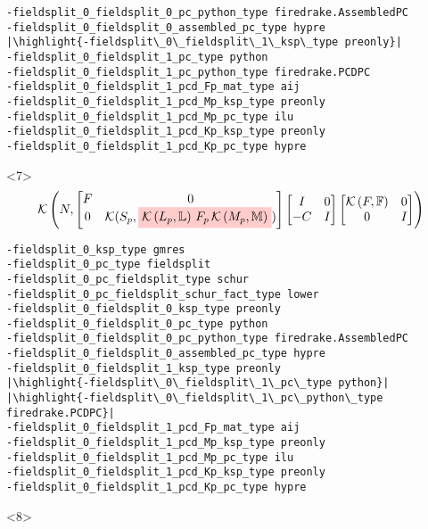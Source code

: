 \documentclass[presentation]{beamer}
\newcommand{\KSP}[2]{\ensuremath{\mathcal{K}\left(#1, \mathbb{#2}\right)}}
\newcommand{\ksp}[1]{\KSP{#1}{#1}}
\newcommand{\highlight}[1]{\colorbox{red!20}{\color{black} #1}}
\begin{document}
\begin{frame}[fragile]
\begin{onlyenv}
\begin{verbatim}
-fieldsplit_0_fieldsplit_0_pc_python_type firedrake.AssembledPC
-fieldsplit_0_fieldsplit_0_assembled_pc_type hypre
|\highlight{-fieldsplit\_0\_fieldsplit\_1\_ksp\_type preonly}|
-fieldsplit_0_fieldsplit_1_pc_type python
-fieldsplit_0_fieldsplit_1_pc_python_type firedrake.PCDPC
-fieldsplit_0_fieldsplit_1_pcd_Fp_mat_type aij
-fieldsplit_0_fieldsplit_1_pcd_Mp_ksp_type preonly
-fieldsplit_0_fieldsplit_1_pcd_Mp_pc_type ilu
-fieldsplit_0_fieldsplit_1_pcd_Kp_ksp_type preonly
-fieldsplit_0_fieldsplit_1_pcd_Kp_pc_type hypre
\end{verbatim}
  \end{onlyenv}
  \begin{onlyenv}<7>
    \color{gray}
    \begin{equation*}
      \KSP{N}{%
        \begin{bmatrix}
        F & 0 \\
        0 & \mathcal{K}(S_p, \highlight{$\KSP{L_p}{L}\,F_p \, \KSP{M_p}{M}$})
      \end{bmatrix}
      \begin{bmatrix}
        I & 0\\
        -C & I
      \end{bmatrix}
      \begin{bmatrix}
        \ksp{F} & 0 \\
        0 & I
      \end{bmatrix}}
    \end{equation*}
\begin{verbatim}
-fieldsplit_0_ksp_type gmres
-fieldsplit_0_pc_type fieldsplit
-fieldsplit_0_pc_fieldsplit_type schur
-fieldsplit_0_pc_fieldsplit_schur_fact_type lower
-fieldsplit_0_fieldsplit_0_ksp_type preonly
-fieldsplit_0_fieldsplit_0_pc_type python
-fieldsplit_0_fieldsplit_0_pc_python_type firedrake.AssembledPC
-fieldsplit_0_fieldsplit_0_assembled_pc_type hypre
-fieldsplit_0_fieldsplit_1_ksp_type preonly
|\highlight{-fieldsplit\_0\_fieldsplit\_1\_pc\_type python}|
|\highlight{-fieldsplit\_0\_fieldsplit\_1\_pc\_python\_type firedrake.PCDPC}|
-fieldsplit_0_fieldsplit_1_pcd_Fp_mat_type aij
-fieldsplit_0_fieldsplit_1_pcd_Mp_ksp_type preonly
-fieldsplit_0_fieldsplit_1_pcd_Mp_pc_type ilu
-fieldsplit_0_fieldsplit_1_pcd_Kp_ksp_type preonly
-fieldsplit_0_fieldsplit_1_pcd_Kp_pc_type hypre
\end{verbatim}
  \end{onlyenv}
  \begin{onlyenv}<8>
    \color{gray}
    \begin{equation*}

\end{equation*}
\end{onlyenv}
\end{frame}
\end{document}

